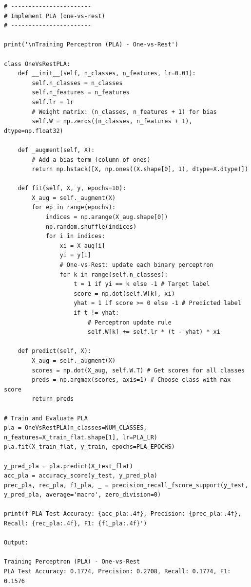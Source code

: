 \documentclass[11pt]{article}
\begin{document}
\vspace{0.4cm}
\begin{verbatim}
# -----------------------
# Implement PLA (one-vs-rest)
# -----------------------

print('\nTraining Perceptron (PLA) - One-vs-Rest')

class OneVsRestPLA:
    def __init__(self, n_classes, n_features, lr=0.01):
        self.n_classes = n_classes
        self.n_features = n_features
        self.lr = lr
        # Weight matrix: (n_classes, n_features + 1) for bias
        self.W = np.zeros((n_classes, n_features + 1), dtype=np.float32)

    def _augment(self, X):
        # Add a bias term (column of ones)
        return np.hstack([X, np.ones((X.shape[0], 1), dtype=X.dtype)])

    def fit(self, X, y, epochs=10):
        X_aug = self._augment(X)
        for ep in range(epochs):
            indices = np.arange(X_aug.shape[0])
            np.random.shuffle(indices)
            for i in indices:
                xi = X_aug[i]
                yi = y[i]
                # One-vs-Rest: update each binary perceptron
                for k in range(self.n_classes):
                    t = 1 if yi == k else -1 # Target label
                    score = np.dot(self.W[k], xi)
                    yhat = 1 if score >= 0 else -1 # Predicted label
                    if t != yhat:
                        # Perceptron update rule
                        self.W[k] += self.lr * (t - yhat) * xi

    def predict(self, X):
        X_aug = self._augment(X)
        scores = np.dot(X_aug, self.W.T) # Get scores for all classes
        preds = np.argmax(scores, axis=1) # Choose class with max score
        return preds

# Train and Evaluate PLA
pla = OneVsRestPLA(n_classes=NUM_CLASSES, n_features=X_train_flat.shape[1], lr=PLA_LR)
pla.fit(X_train_flat, y_train, epochs=PLA_EPOCHS)

y_pred_pla = pla.predict(X_test_flat)
acc_pla = accuracy_score(y_test, y_pred_pla)
prec_pla, rec_pla, f1_pla, _ = precision_recall_fscore_support(y_test, y_pred_pla, average='macro', zero_division=0)

print(f'PLA Test Accuracy: {acc_pla:.4f}, Precision: {prec_pla:.4f}, Recall: {rec_pla:.4f}, F1: {f1_pla:.4f}')

Output:

Training Perceptron (PLA) - One-vs-Rest
PLA Test Accuracy: 0.1774, Precision: 0.2708, Recall: 0.1774, F1: 0.1576

\end{verbatim}
\end{document}
